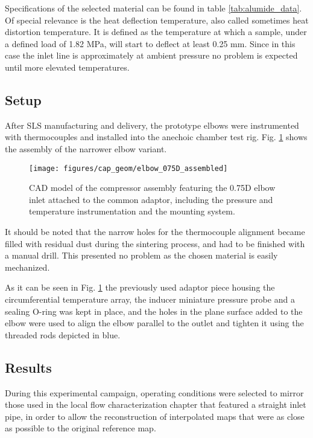 Specifications of the selected material can be found in table \ref{tab:alumide_data}. Of special relevance is the heat deflection temperature, also called sometimes heat distortion temperature. It is defined as the temperature at which a sample, under a defined load of 1.82 MPa, will start to deflect at least 0.25 mm. Since in this case the inlet line is approximately at ambient pressure no problem is expected until more elevated temperatures.

\subsection{Setup}

After SLS manufacturing and delivery, the prototype elbows were instrumented with thermocouples and installed into the anechoic chamber test rig. Fig. \ref{fig:elbow_075D_assembled} shows the assembly of the narrower elbow variant.

\begin{figure}[b!]
\centering
\texttt{[image: figures/cap\_geom/elbow\_075D\_assembled]}
\caption{CAD model of the compressor assembly featuring the 0.75D elbow inlet attached to the common adaptor, including the pressure and temperature instrumentation and the mounting system.}
\label{fig:elbow_075D_assembled}
\end{figure}

It should be noted that the narrow holes for the thermocouple alignment became filled with residual dust during the sintering process, and had to be finished with a manual drill. This presented no problem as the chosen material is easily mechanized.

As it can be seen in Fig. \ref{fig:elbow_075D_assembled} the previously used adaptor piece housing the circumferential temperature array, the inducer miniature pressure probe and a sealing O-ring was kept in place, and the holes in the plane surface added to the elbow were used to align the elbow parallel to the outlet and tighten it using the threaded rods depicted in blue.

\subsection{Results}

During this experimental campaign, operating conditions were selected to mirror those used in the local flow characterization chapter that featured a straight inlet pipe, in order to allow the reconstruction of interpolated maps that were as close as possible to the original reference map.

